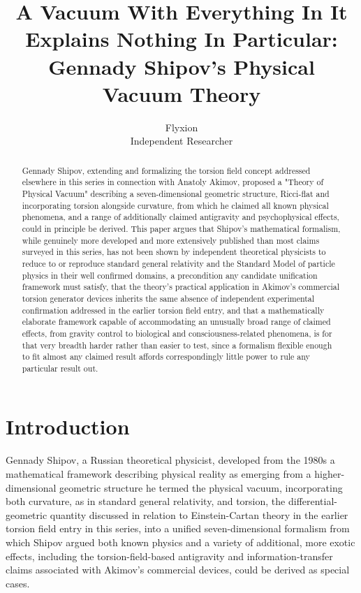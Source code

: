 \documentclass[11pt]{article}
\title{A Vacuum With Everything In It Explains Nothing In Particular: Gennady Shipov's Physical Vacuum Theory}
\author{Flyxion \\ \small Independent Researcher}
\date{}
\begin{document}
\maketitle

\begin{abstract}
Gennady Shipov, extending and formalizing the torsion field concept addressed elsewhere in this series in connection with Anatoly Akimov, proposed a "Theory of Physical Vacuum" describing a seven-dimensional geometric structure, Ricci-flat and incorporating torsion alongside curvature, from which he claimed all known physical phenomena, and a range of additionally claimed antigravity and psychophysical effects, could in principle be derived. This paper argues that Shipov's mathematical formalism, while genuinely more developed and more extensively published than most claims surveyed in this series, has not been shown by independent theoretical physicists to reduce to or reproduce standard general relativity and the Standard Model of particle physics in their well confirmed domains, a precondition any candidate unification framework must satisfy, that the theory's practical application in Akimov's commercial torsion generator devices inherits the same absence of independent experimental confirmation addressed in the earlier torsion field entry, and that a mathematically elaborate framework capable of accommodating an unusually broad range of claimed effects, from gravity control to biological and consciousness-related phenomena, is for that very breadth harder rather than easier to test, since a formalism flexible enough to fit almost any claimed result affords correspondingly little power to rule any particular result out.
\end{abstract}

\section{Introduction}

Gennady Shipov, a Russian theoretical physicist, developed from the 1980s a mathematical framework describing physical reality as emerging from a higher-dimensional geometric structure he termed the physical vacuum, incorporating both curvature, as in standard general relativity, and torsion, the differential-geometric quantity discussed in relation to Einstein-Cartan theory in the earlier torsion field entry in this series, into a unified seven-dimensional formalism from which Shipov argued both known physics and a variety of additional, more exotic effects, including the torsion-field-based antigravity and information-transfer claims associated with Akimov's commercial devices, could be derived as special cases.
\end{document}
